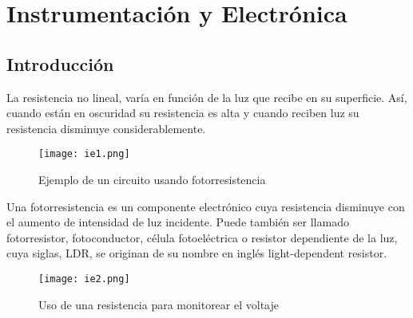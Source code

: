 \chapter{Instrumentación y Electrónica}
\section{Introducción}

\begin{definition}[LDR]
    La resistencia no lineal, varía en función de la luz que recibe en su superficie. Así, cuando están en oscuridad su resistencia es alta y cuando reciben luz su resistencia disminuye considerablemente.
\end{definition}

\begin{figure}[h!]
\centering
  \texttt{[image: ie1.png]}
  \caption{Ejemplo de un circuito usando fotorresistencia}
  \label{ie1}
\end{figure}

Una fotorresistencia es un componente electrónico cuya resistencia disminuye con el aumento de intensidad de luz incidente. Puede también ser llamado fotorresistor, fotoconductor, célula fotoeléctrica o resistor dependiente de la luz, cuya siglas, LDR, se originan de su nombre en inglés light-dependent resistor.

\begin{figure}[h!]
    \centering
      \texttt{[image: ie2.png]}
      \caption{Uso de una resistencia para monitorear el voltaje}
      \label{ie222}
\end{figure}

